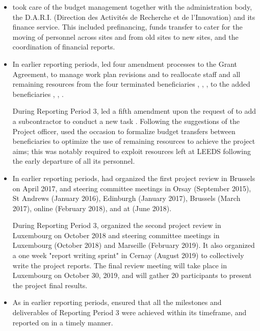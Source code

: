\begin{itemize}
\item {} took care of the budget management together with the
  administration body, the D.A.R.I. (Direction des Activités de
  Recherche et de l'Innovation) and its finance service. This included
  prefinancing, funds transfer to cater for the moving of personnel
  across sites and from old sites to new sites, and the coordination
  of financial reports.
\item In earlier reporting periods,  led four amendment
  processes to the Grant Agreement, to manage work plan revisions and
  to reallocate staff and all remaining resources from the four
  terminated beneficiaries , , ,
   to the added beneficiaries , ,
  .

  \noindent
  During Reporting Period 3,  led a fifth amendment upon
  the request of  to add a subcontractor to conduct a new
  task . Following the suggestions of
  the Project officer,  used the occasion to formalize budget
  transfers between beneficiaries to optimize the use of remaining
  resources to achieve the project aims; this was notably required to
  exploit resources left at LEEDS following the early departure of all
  its personnel.

\item In earlier reporting periods,  had organized the first
  project review in Brussels on April 2017, and steering committee
  meetings in Orsay (September 2015), St Andrews (January 2016),
  Edinburgh (January 2017), Brussels (March 2017), online (February
  2018), and at  (June 2018).

  \noindent
  During Reporting Period 3,  organized the second project
  review in Luxembourg on October 2018 and steering committee meetings
  in Luxembourg (October 2018) and Marseille (February 2019). It also
  organized a one week "report writing sprint" in Cernay (August 2019)
  to collectively write the project reports. The final review meeting
  will take place in Luxembourg on October 30, 2019, and will gather
  20 \ODK participants to present the project final results.

\item As in earlier reporting periods,  ensured that all the
  milestones and deliverables of Reporting Period 3 were achieved
  within its timeframe, and reported on in a timely manner.


\end{itemize}
